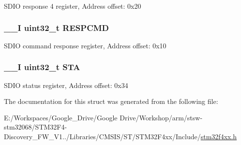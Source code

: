 S\-D\-I\-O response 4 register, Address offset\-: 0x20 \hypertarget{struct_s_d_i_o___type_def_aad371db807e2db4a2edf05b3f2f4b6cd}{
\subsubsection[{R\-E\-S\-P\-C\-M\-D}]{\setlength{\rightskip}{0pt plus 5cm}\-\_\-\-\_\-\-I uint32\-\_\-t R\-E\-S\-P\-C\-M\-D}}\label{struct_s_d_i_o___type_def_aad371db807e2db4a2edf05b3f2f4b6cd}
S\-D\-I\-O command response register, Address offset\-: 0x10 \hypertarget{struct_s_d_i_o___type_def_a7520cdf6f3df68c2f147bdd87fb8a96f}{
\subsubsection[{S\-T\-A}]{\setlength{\rightskip}{0pt plus 5cm}\-\_\-\-\_\-\-I uint32\-\_\-t S\-T\-A}}\label{struct_s_d_i_o___type_def_a7520cdf6f3df68c2f147bdd87fb8a96f}
S\-D\-I\-O status register, Address offset\-: 0x34 

The documentation for this struct was generated from the following file\-:\begin{DoxyCompactItemize}
\item 
E\-:/\-Workspaces/\-Google\-\_\-\-Drive/\-Google Drive/\-Workshop/arm/stsw-\/stm32068/\-S\-T\-M32\-F4-\/\-Discovery\-\_\-\-F\-W\-\_\-\-V1../\-Libraries/\-C\-M\-S\-I\-S/\-S\-T/\-S\-T\-M32\-F4xx/\-Include/\hyperlink{stm32f4xx_8h}{stm32f4xx.\-h}\end{DoxyCompactItemize}
